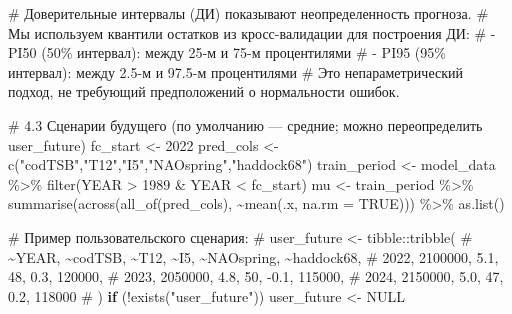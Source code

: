 \documentclass[
  letterpaper,
  DIV=11,
  numbers=noendperiod]{scrreprt}
\newenvironment{Shaded}{\begin{snugshade}}{\end{snugshade}}
\newcommand{\AttributeTok}[1]{\textcolor[rgb]{0.40,0.45,0.13}{#1}}
\newcommand{\CommentTok}[1]{\textcolor[rgb]{0.37,0.37,0.37}{#1}}
\newcommand{\ConstantTok}[1]{\textcolor[rgb]{0.56,0.35,0.01}{#1}}
\newcommand{\ControlFlowTok}[1]{\textcolor[rgb]{0.00,0.23,0.31}{\textbf{#1}}}
\newcommand{\DecValTok}[1]{\textcolor[rgb]{0.68,0.00,0.00}{#1}}
\newcommand{\FunctionTok}[1]{\textcolor[rgb]{0.28,0.35,0.67}{#1}}
\newcommand{\NormalTok}[1]{\textcolor[rgb]{0.00,0.23,0.31}{#1}}
\newcommand{\OtherTok}[1]{\textcolor[rgb]{0.00,0.23,0.31}{#1}}
\newcommand{\SpecialCharTok}[1]{\textcolor[rgb]{0.37,0.37,0.37}{#1}}
\newcommand{\StringTok}[1]{\textcolor[rgb]{0.13,0.47,0.30}{#1}}
\begin{document}
\begin{Shaded}
\begin{Highlighting}[]
\CommentTok{\# Доверительные интервалы (ДИ) показывают неопределенность прогноза.}
\CommentTok{\# Мы используем квантили остатков из кросс{-}валидации для построения ДИ:}
\CommentTok{\#   {-} PI50 (50\% интервал): между 25{-}м и 75{-}м процентилями}
\CommentTok{\#   {-} PI95 (95\% интервал): между 2.5{-}м и 97.5{-}м процентилями}
\CommentTok{\# Это непараметрический подход, не требующий предположений о нормальности ошибок.}

\CommentTok{\# 4.3 Сценарии будущего (по умолчанию — средние; можно переопределить user\_future)}
\NormalTok{fc\_start }\OtherTok{\textless{}{-}} \DecValTok{2022}
\NormalTok{pred\_cols }\OtherTok{\textless{}{-}} \FunctionTok{c}\NormalTok{(}\StringTok{"codTSB"}\NormalTok{,}\StringTok{"T12"}\NormalTok{,}\StringTok{"I5"}\NormalTok{,}\StringTok{"NAOspring"}\NormalTok{,}\StringTok{"haddock68"}\NormalTok{)}
\NormalTok{train\_period }\OtherTok{\textless{}{-}}\NormalTok{ model\_data }\SpecialCharTok{\%\textgreater{}\%} \FunctionTok{filter}\NormalTok{(YEAR }\SpecialCharTok{\textgreater{}} \DecValTok{1989} \SpecialCharTok{\&}\NormalTok{ YEAR }\SpecialCharTok{\textless{}}\NormalTok{ fc\_start)}
\NormalTok{mu }\OtherTok{\textless{}{-}}\NormalTok{ train\_period }\SpecialCharTok{\%\textgreater{}\%} \FunctionTok{summarise}\NormalTok{(}\FunctionTok{across}\NormalTok{(}\FunctionTok{all\_of}\NormalTok{(pred\_cols), }\SpecialCharTok{\textasciitilde{}}\FunctionTok{mean}\NormalTok{(.x, }\AttributeTok{na.rm =} \ConstantTok{TRUE}\NormalTok{))) }\SpecialCharTok{\%\textgreater{}\%} \FunctionTok{as.list}\NormalTok{()}

\CommentTok{\# Пример пользовательского сценария:}
\CommentTok{\# user\_future \textless{}{-} tibble::tribble(}
\CommentTok{\#   \textasciitilde{}YEAR, \textasciitilde{}codTSB, \textasciitilde{}T12, \textasciitilde{}I5, \textasciitilde{}NAOspring, \textasciitilde{}haddock68,}
\CommentTok{\#   2022, 2100000, 5.1, 48,  0.3, 120000,}
\CommentTok{\#   2023, 2050000, 4.8, 50, {-}0.1, 115000,}
\CommentTok{\#   2024, 2150000, 5.0, 47,  0.2, 118000}
\CommentTok{\# )}
\ControlFlowTok{if}\NormalTok{ (}\SpecialCharTok{!}\FunctionTok{exists}\NormalTok{(}\StringTok{"user\_future"}\NormalTok{)) user\_future }\OtherTok{\textless{}{-}} \ConstantTok{NULL}


\end{Highlighting}
\end{Shaded}
\end{document}
